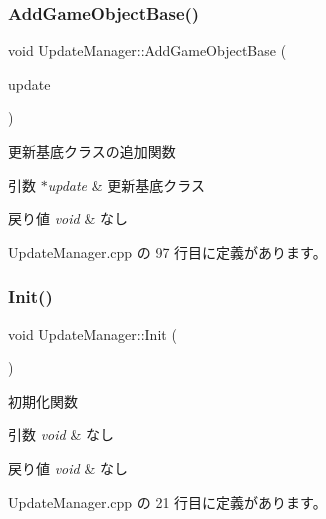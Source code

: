 \subsubsection{\texorpdfstring{Add\+Game\+Object\+Base()}{AddGameObjectBase()}}
{\footnotesize\ttfamily void Update\+Manager\+::\+Add\+Game\+Object\+Base (\begin{DoxyParamCaption}\item[{\mbox{\hyperlink{class_game_object_base}{Game\+Object\+Base}} $\ast$}]{update }\end{DoxyParamCaption})}



更新基底クラスの追加関数 


\begin{DoxyParams}{引数}
{\em $\ast$update} & 更新基底クラス \\
\hline
\end{DoxyParams}

\begin{DoxyRetVals}{戻り値}
{\em void} & なし \\
\hline
\end{DoxyRetVals}


 Update\+Manager.\+cpp の 97 行目に定義があります。

\mbox{\label{class_update_manager_a7b0a2a3bf51d4fcb83fd25fe642fc66b}} 
\subsubsection{\texorpdfstring{Init()}{Init()}}
{\footnotesize\ttfamily void Update\+Manager\+::\+Init (\begin{DoxyParamCaption}{ }\end{DoxyParamCaption})}



初期化関数 


\begin{DoxyParams}{引数}
{\em void} & なし \\
\hline
\end{DoxyParams}

\begin{DoxyRetVals}{戻り値}
{\em void} & なし \\
\hline
\end{DoxyRetVals}


 Update\+Manager.\+cpp の 21 行目に定義があります。

